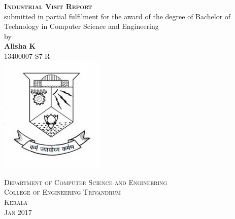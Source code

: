 \documentclass[a4paper,12pt]{report}
\begin{document}
	\begin{titlepage}
		\begin{centering}
		 
		
		\textsc{\textbf{\LARGE{Industrial Visit Report}}}\\[2cm]


		\large{submitted in partial fulfilment for the award of the degree of Bachelor of Technology in Computer Science and Engineering}\\[1.5cm]

		\large{by}\\[0.5cm]

		\textbf{Alisha K     }\\
		{13400007 S7 R}\\[2cm]
		

		\includegraphics[width=5cm]{images/logo.jpg}

		\textsc{Department of Computer Science and Engineering}\\
		\textsc{College of Engineering Trivandrum}\\
		\textsc{Kerala}\\[0.5cm]
		\textsc{Jan 2017}\\
		\vfill %
		\end{centering}
	\end{titlepage}
\end{document}
